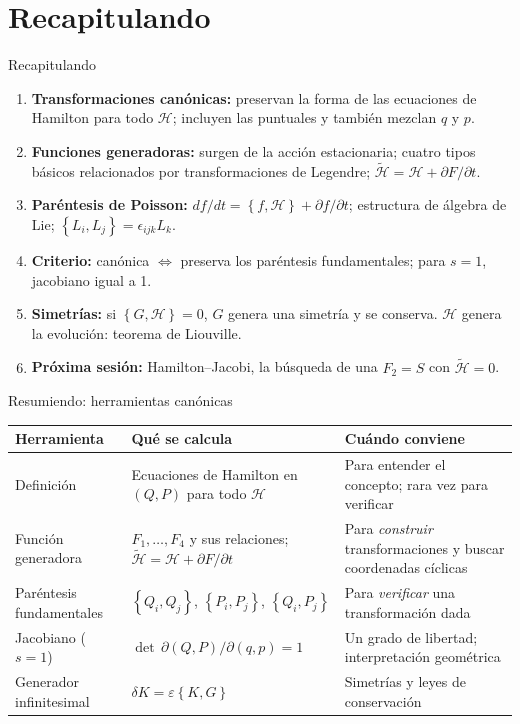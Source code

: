 \documentclass[spanish]{beamer}
\newcommand{\Ham}{\mathcal{H}}               %
\newcommand{\tH}{\tilde{\mathcal{H}}}        %
\newcommand{\pb}[2]{\left\{#1,#2\right\}}    %
\begin{document}
\section{Recapitulando}

\begin{frame}{Recapitulando}
\begin{enumerate}[<+->]
  \item \textbf{Transformaciones canónicas:} preservan la forma de las ecuaciones de
        Hamilton para todo $\Ham$; incluyen las puntuales y también mezclan $q$ y $p$.
  \item \textbf{Funciones generadoras:} surgen de la acción estacionaria;
        cuatro tipos básicos relacionados por transformaciones de Legendre;
        $\tH=\Ham+\partial F/\partial t$.
  \item \textbf{Paréntesis de Poisson:} $df/dt=\pb{f}{\Ham}+\partial f/\partial t$;
        estructura de álgebra de Lie; $\pb{L_i}{L_j}=\epsilon_{ijk}L_k$.
  \item \textbf{Criterio:} canónica $\iff$ preserva los paréntesis fundamentales;
        para $s=1$, jacobiano igual a 1.
  \item \textbf{Simetrías:} si $\pb{G}{\Ham}=0$, $G$ genera una simetría y se conserva.
        $\Ham$ genera la evolución: teorema de Liouville.
  \item \textbf{Próxima sesión:} Hamilton--Jacobi, la búsqueda de una $F_2=S$ con $\tH=0$.
\end{enumerate}
\end{frame}

\begin{frame}{Resumiendo: herramientas canónicas}
\scriptsize
\renewcommand{\arraystretch}{1.6}
\begin{tabular}{@{}>{\raggedright}p{}>{\raggedright}p{}>{\raggedright\arraybackslash}p{}@{}}
  \toprule
  \textbf{Herramienta} & \textbf{Qué se calcula} & \textbf{Cuándo conviene} \\
  \midrule
  Definición & Ecuaciones de Hamilton en $(Q,P)$ para todo $\Ham$
             & Para entender el concepto; rara vez para verificar \\
  Función generadora & $F_1,\dots,F_4$ y sus relaciones; $\tH=\Ham+\partial F/\partial t$
                     & Para \emph{construir} transformaciones y buscar coordenadas cíclicas \\
  Paréntesis fundamentales & $\pb{Q_i}{Q_j}$, $\pb{P_i}{P_j}$, $\pb{Q_i}{P_j}$
                           & Para \emph{verificar} una transformación dada \\
  Jacobiano ($s=1$) & $\det\,\partial(Q,P)/\partial(q,p)=1$
                    & Un grado de libertad; interpretación geométrica \\
  Generador infinitesimal & $\delta K=\varepsilon\pb{K}{G}$
                          & Simetrías y leyes de conservación \\
  \bottomrule
\end{tabular}
\end{frame}
\end{document}

